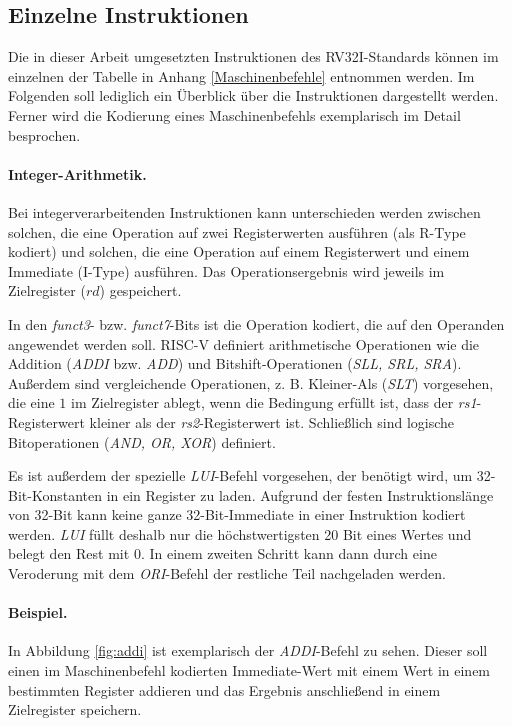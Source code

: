 \subsection{Einzelne Instruktionen}
Die in dieser Arbeit umgesetzten Instruktionen des RV32I-Standards können im einzelnen der Tabelle in Anhang \ref{Maschinenbefehle} entnommen werden. Im Folgenden soll lediglich ein Überblick über die Instruktionen dargestellt werden. Ferner wird die Kodierung eines Maschinenbefehls exemplarisch im Detail besprochen.

\paragraph{Integer-Arithmetik.}
Bei integerverarbeitenden Instruktionen kann unterschieden werden zwischen solchen, die eine Operation auf zwei Registerwerten ausführen (als R-Type kodiert) und solchen, die eine Operation auf einem Registerwert und einem Immediate (I-Type) ausführen. Das Operationsergebnis wird jeweils im Zielregister ($rd$) gespeichert.

In den \emph{funct3}- bzw. \emph{funct7}-Bits ist die Operation kodiert,
die auf den Operanden angewendet werden soll. RISC-V definiert
arithmetische Operationen wie die Addition (\emph{ADDI} bzw. \emph{ADD})
und Bitshift-Operationen (\textit{SLL, SRL, SRA}). Außerdem sind
vergleichende Operationen, z. B. Kleiner-Als (\textit{SLT}) vorgesehen,
die eine $1$ im Zielregister ablegt, wenn die Bedingung erfüllt ist,
dass der \emph{rs1}-Registerwert kleiner als der \emph{rs2}-Registerwert
ist. Schließlich sind logische Bitoperationen (\textit{AND, OR, XOR}) definiert.

Es ist außerdem der spezielle \textit{LUI}-Befehl vorgesehen, der
benötigt wird, um 32-Bit-Konstanten in ein Register zu laden. Aufgrund
der festen Instruktionslänge von 32-Bit kann keine ganze
32-Bit-Immediate in einer Instruktion kodiert werden. \textit{LUI} füllt 
deshalb nur die höchstwertigsten 20 Bit eines Wertes und belegt den Rest mit $0$. In einem 
zweiten Schritt kann dann durch eine Veroderung mit dem \textit{ORI}-Befehl der restliche Teil nachgeladen werden.

\paragraph{Beispiel.} In Abbildung \ref{fig:addi} ist exemplarisch der \textit{ADDI}-Befehl zu sehen. Dieser soll einen im Maschinenbefehl kodierten Immediate-Wert mit einem Wert in einem bestimmten Register addieren und das Ergebnis anschließend in einem Zielregister speichern.
 
